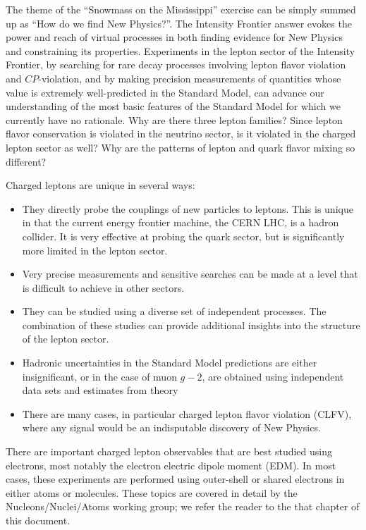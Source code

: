 The theme of the ``Snowmass on the Mississippi'' exercise can be simply summed up as ``How do we find New Physics?''. The Intensity Frontier answer evokes the power and reach of virtual processes in both finding evidence for New Physics and constraining its properties. Experiments in the lepton sector of the Intensity Frontier, by searching for rare decay processes involving lepton flavor violation and $C\!P$-violation, and by making precision measurements of quantities whose value is extremely well-predicted in the Standard Model, can advance our understanding of the most basic features of the Standard Model for which we currently have no rationale. Why are there three lepton families? Since lepton flavor conservation is violated in the neutrino sector, is it violated in the charged lepton sector as well? Why are the patterns of lepton and quark flavor mixing so different?

 Charged leptons are unique in several ways:
\begin{itemize}
\item
They directly probe the couplings of new particles to leptons.  This is unique in that the current energy frontier machine, the 
CERN LHC, is a hadron
collider. It is very effective at probing the quark sector, but
is significantly more limited in the lepton sector.
\item
Very
precise measurements  and sensitive searches can be made at a level that is difficult to achieve in
other sectors.
\item
They can be studied using a diverse set of independent
processes. The combination of these studies can provide additional
insights into the structure of the lepton sector.
\item
Hadronic uncertainties in the Standard Model predictions are either insignificant, or in the case of muon $g-2$, are obtained using independent data sets and estimates from theory
\item
There are  many cases, in particular charged lepton flavor violation (CLFV), where any signal would be an indisputable discovery of New Physics.
\end{itemize}

There are important charged lepton observables that are best studied using electrons, most notably the electron electric dipole moment (EDM).  In most cases, these experiments are performed using outer-shell or shared electrons in either atoms or molecules.  These topics are covered in detail by the Nucleons/Nuclei/Atoms working group; we refer the reader to the that chapter of this document.

